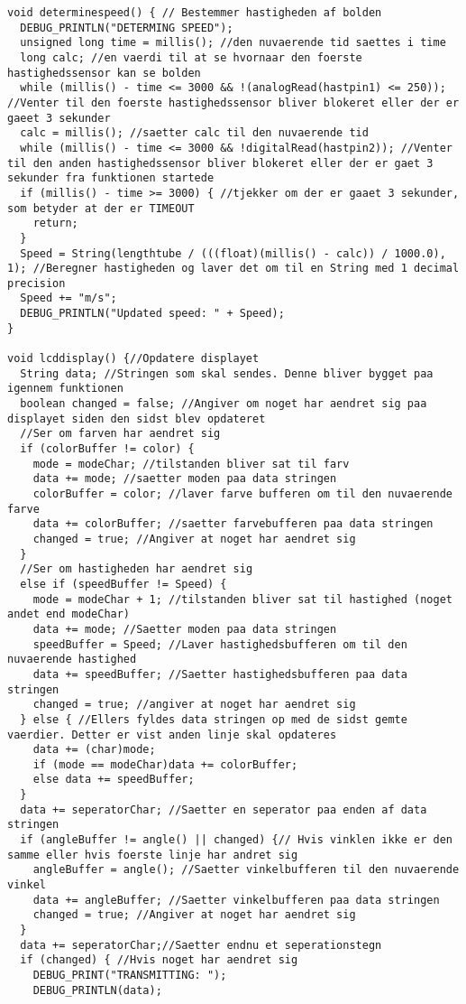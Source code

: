\begin{lstlisting}
void determinespeed() { // Bestemmer hastigheden af bolden
  DEBUG_PRINTLN("DETERMING SPEED");
  unsigned long time = millis(); //den nuvaerende tid saettes i time
  long calc; //en vaerdi til at se hvornaar den foerste hastighedssensor kan se bolden
  while (millis() - time <= 3000 && !(analogRead(hastpin1) <= 250)); //Venter til den foerste hastighedssensor bliver blokeret eller der er gaeet 3 sekunder
  calc = millis(); //saetter calc til den nuvaerende tid
  while (millis() - time <= 3000 && !digitalRead(hastpin2)); //Venter til den anden hastighedssensor bliver blokeret eller der er gaet 3 sekunder fra funktionen startede
  if (millis() - time >= 3000) { //tjekker om der er gaaet 3 sekunder, som betyder at der er TIMEOUT
    return;
  }
  Speed = String(lengthtube / (((float)(millis() - calc)) / 1000.0), 1); //Beregner hastigheden og laver det om til en String med 1 decimal precision
  Speed += "m/s";
  DEBUG_PRINTLN("Updated speed: " + Speed);
}

void lcddisplay() {//Opdatere displayet
  String data; //Stringen som skal sendes. Denne bliver bygget paa igennem funktionen
  boolean changed = false; //Angiver om noget har aendret sig paa displayet siden den sidst blev opdateret
  //Ser om farven har aendret sig
  if (colorBuffer != color) {
    mode = modeChar; //tilstanden bliver sat til farv
    data += mode; //saetter moden paa data stringen
    colorBuffer = color; //laver farve bufferen om til den nuvaerende farve
    data += colorBuffer; //saetter farvebufferen paa data stringen
    changed = true; //Angiver at noget har aendret sig
  }
  //Ser om hastigheden har aendret sig
  else if (speedBuffer != Speed) {
    mode = modeChar + 1; //tilstanden bliver sat til hastighed (noget andet end modeChar)
    data += mode; //Saetter moden paa data stringen
    speedBuffer = Speed; //Laver hastighedsbufferen om til den nuvaerende hastighed
    data += speedBuffer; //Saetter hastighedsbufferen paa data stringen
    changed = true; //angiver at noget har aendret sig
  } else { //Ellers fyldes data stringen op med de sidst gemte vaerdier. Detter er vist anden linje skal opdateres
    data += (char)mode;
    if (mode == modeChar)data += colorBuffer;
    else data += speedBuffer;
  }
  data += seperatorChar; //Saetter en seperator paa enden af data stringen
  if (angleBuffer != angle() || changed) {// Hvis vinklen ikke er den samme eller hvis foerste linje har andret sig
    angleBuffer = angle(); //Saetter vinkelbufferen til den nuvaerende vinkel
    data += angleBuffer; //Saetter vinkelbufferen paa data stringen
    changed = true; //Angiver at noget har aendret sig
  }
  data += seperatorChar;//Saetter endnu et seperationstegn
  if (changed) { //Hvis noget har aendret sig
    DEBUG_PRINT("TRANSMITTING: ");
    DEBUG_PRINTLN(data);


\end{lstlisting}

